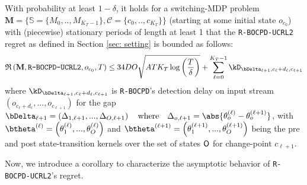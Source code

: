 \documentclass{article} %
\begin{document}
\begin{theorem} With probability at least $1-\delta$, it holds for a switching-MDP problem $\mathbf{M} = \{\mathbb{S}=\{M_0,..,M_{K_T-1}\}, \mathcal{C}=\{c_0,..,c_{K_T}\}\}$ (starting at some initial state $o_{c_0}$) with (piecewise) stationary periods of length at least 1 that the \texttt{R-BOCPD-UCRL2} regret as defined in Section \ref{sec: setting} is bounded as follows:
\begin{align*}
    \mathfrak{R} \left(\mathbf{M}, \texttt{R-BOCPD-UCRL2}, o_{c_0}, T\right) \leq 34 D O \sqrt{A T K_T \log\left (\frac{T}{\delta} \right)} + \sum\limits_{\ell=0}^{K_T-1} \kD_{\bDelta_{\ell+1},c_{\ell}+d_{\ell},c_{\ell+1}} 
\end{align*}
where $\kD_{\bDelta_{\ell+1},c_{\ell}+d_{\ell},c_{\ell+1}}$ is \texttt{R-BOCPD}'s detection delay on input stream $(o_{c_{\ell}+d_{\ell}}, ..., o_{c_{\ell+1}})$ for the gap $\bDelta_{\ell+1} =  \left(\Delta_{1,\ell+1},...,\Delta_{O,\ell+1} \right) \quad \text{where} \quad \Delta_{o,\ell+1} =  \abs{\theta^{(\ell)}_o - \theta^{(\ell+1)}_o}$, with $\btheta^{(\ell)} = \left(\theta^{(\ell)}_1,...,\theta^{(\ell)}_O \right)$ and $\btheta^{(\ell+1)} = \left(\theta^{(\ell+1)}_1,...,\theta^{(\ell+1)}_O \right)$ being the pre and post state-transition kernels over the set of states ${\mathsf{O}}$ for change-point $c_{\ell+1}$.
\label{main_theorem}
\end{theorem}

Now, we introduce a corollary to characterize the asymptotic behavior of \texttt{R-BOCPD-UCRL2}'s regret.
\end{document}
